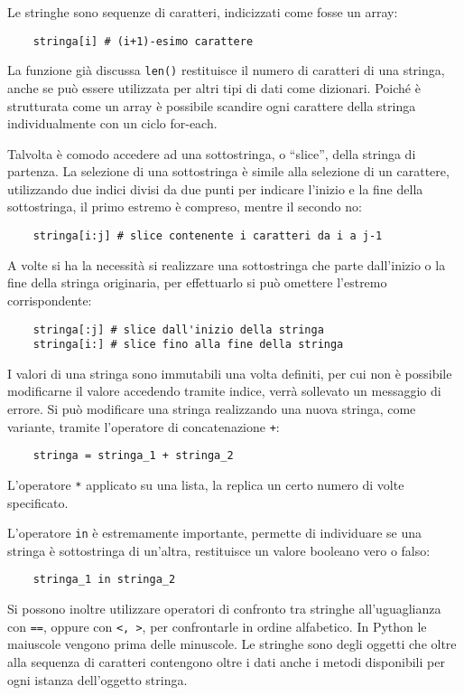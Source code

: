 \documentclass{article}
\numberwithin{equation}{subsection}
\begin{document}
Le stringhe sono sequenze di caratteri, indicizzati come fosse un array:
\begin{verbatim}
    stringa[i] # (i+1)-esimo carattere
\end{verbatim}
La funzione già discussa \verb|len()| restituisce il numero di caratteri di una stringa, 
anche se può essere utilizzata per altri tipi di dati come dizionari. Poiché è strutturata come un array è possibile scandire ogni carattere della stringa individualmente 
con un ciclo for-each. 

Talvolta è comodo accedere ad una sottostringa, o ``slice'', della stringa di partenza. La selezione di una sottostringa è simile alla selezione di un carattere, 
utilizzando due indici divisi da due punti per indicare l'inizio e la fine della sottostringa, il primo estremo è compreso, mentre il secondo no:
\begin{verbatim}
    stringa[i:j] # slice contenente i caratteri da i a j-1
\end{verbatim}

A volte si ha la necessità si realizzare una sottostringa che parte dall'inizio o la fine della stringa originaria, per effettuarlo si può omettere l'estremo 
corrispondente:
\begin{verbatim}
    stringa[:j] # slice dall'inizio della stringa
    stringa[i:] # slice fino alla fine della stringa
\end{verbatim}

I valori di una stringa sono immutabili una volta definiti, per cui non è possibile modificarne il valore accedendo tramite indice, verrà sollevato un messaggio di errore. 
Si può modificare una stringa realizzando una nuova stringa, come variante, tramite l'operatore di concatenazione \verb|+|:
\begin{verbatim}
    stringa = stringa_1 + stringa_2 
\end{verbatim}

L'operatore \verb|*| applicato su una lista, la replica un certo numero di volte specificato. 

L'operatore \verb|in| è estremamente importante, permette di individuare se una stringa è sottostringa di un'altra, restituisce un valore booleano vero o falso:
\begin{verbatim}
    stringa_1 in stringa_2
\end{verbatim}

Si possono inoltre utilizzare operatori di confronto tra stringhe all'uguaglianza con \verb|==|, oppure con \verb|<, >|, per confrontarle in ordine alfabetico. 
In Python le maiuscole vengono prima delle minuscole. 
Le stringhe sono degli oggetti che oltre alla sequenza di caratteri contengono oltre i dati anche i metodi disponibili per ogni istanza dell'oggetto stringa. 
\end{document}

